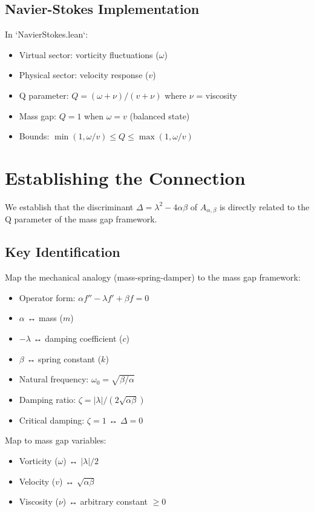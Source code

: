 \documentclass[11pt]{article}
\begin{document}
\subsection{Navier-Stokes Implementation}
In `NavierStokes.lean`:
\begin{itemize}
\item Virtual sector: vorticity fluctuations ($\omega$)
\item Physical sector: velocity response ($v$)
\item Q parameter: $Q = (\omega + \nu)/(v + \nu)$ where $\nu$ = viscosity
\item Mass gap: $Q = 1$ when $\omega = v$ (balanced state)
\item Bounds: $\min(1, \omega/v) \leq Q \leq \max(1, \omega/v)$
\end{itemize}

\section{Establishing the Connection}

We establish that the discriminant $\Delta = \lambda^2 - 4\alpha\beta$ of $A_{\alpha,\beta}$ is directly related to the Q parameter of the mass gap framework.

\subsection{Key Identification}
Map the mechanical analogy (mass-spring-damper) to the mass gap framework:
\begin{itemize}
\item Operator form: $\alpha f'' - \lambda f' + \beta f = 0$
  \item $\alpha$ ↔ mass ($m$)
  \item $-\lambda$ ↔ damping coefficient ($c$)
  \item $\beta$ ↔ spring constant ($k$)
\item Natural frequency: $\omega_0 = \sqrt{\beta/\alpha}$
\item Damping ratio: $\zeta = |\lambda|/(2\sqrt{\alpha\beta})$
\item Critical damping: $\zeta = 1$ ↔ $\Delta = 0$
\end{itemize}

Map to mass gap variables:
\begin{itemize}
\item Vorticity ($\omega$) ↔ $|\lambda|/2$
\item Velocity ($v$) ↔ $\sqrt{\alpha\beta}$
\item Viscosity ($\nu$) ↔ arbitrary constant $\geq 0$
\end{itemize}
\end{document}
